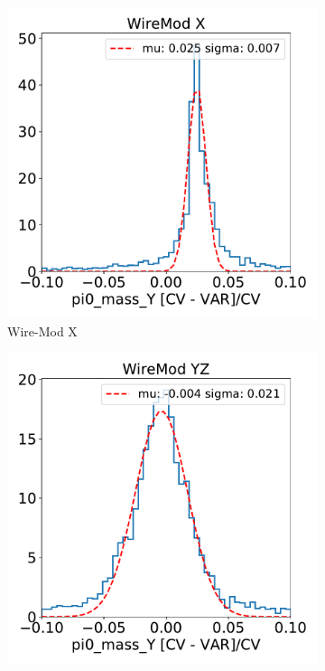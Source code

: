 \documentclass[a4paper]{article}
\begin{document}
\begin{figure}[H]
\begin{center}
    
    \begin{subfigure}[b]{0.24\textwidth}
    \centering
    \includegraphics[width=1.00\textwidth]{detsys/pi0/pi0_mass_Y_1d_03232020_WireMod_X.pdf}
    \caption{\label{fig:detsys:pi0mass:WMX}Wire-Mod X}
    \end{subfigure}
    \begin{subfigure}[b]{0.24\textwidth}
    \centering
    \includegraphics[width=1.00\textwidth]{detsys/pi0/pi0_mass_Y_1d_03232020_WireMod_YZ.pdf}

\end{subfigure}
\end{center}
\end{figure}
\end{document}
